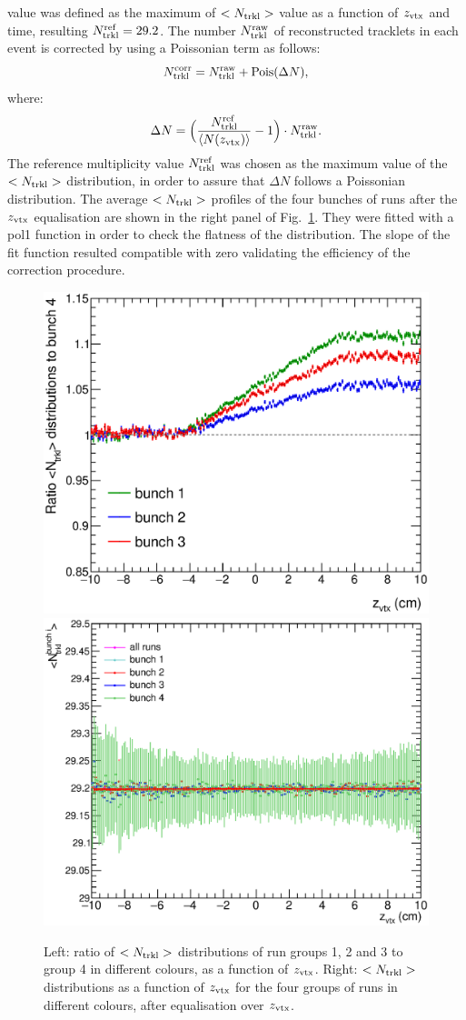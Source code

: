 value was defined as the maximum of $<N_{\rm trkl}>$ value as a function of $z_{\rm vtx}$ and time,
resulting $N_{\rm trkl}^{\rm ref} =  29.2$. 
The number $N_{\rm trkl}^{\rm raw}$ of reconstructed tracklets in each event
is corrected by using a Poissonian term as follows:
\begin{equation} 
\label{eq:NtrklCorr}
N_{\rm trkl}^{\rm corr} = N_{\rm trkl}^{\rm raw} + {\rm Pois}(\Delta N),
\end{equation}
where:
\begin{equation} 
\label{eq:NtrklCorr}
\Delta N = \Big (\frac{N_{\rm trkl}^{\rm ref}}{\langle N(z_{\rm vtx}) \rangle} -1 \Big ) \cdot N_{\rm trkl}^{\rm raw}.
\end{equation}
 The reference multiplicity value $N_{\rm trkl}^{\rm ref}$ was chosen as the
 maximum value of the \mbox{$<N_{\rm trkl}>$} distribution, in order to assure
 that $\Delta N$ follows a Poissonian distribution. 
The average $<N_{\rm trkl}>$ profiles of the four bunches of runs 
after the $z_{\rm vtx}$ equalisation are shown in the right panel of 
Fig.~\ref{fig:FourBunches}. They were fitted with a pol1 function in order
to check the flatness of the distribution. The slope of the fit function resulted compatible with zero
validating the efficiency of the correction procedure.

\begin{figure}[h]
\centering
 \includegraphics[width=.49\textwidth]{FigCap6/UncorrNtrklProfileDataRatio.eps}
 \includegraphics[width=.49\textwidth]{FigCap6/NtrkProfilesDataAfterZVxtEqual.eps}
 \caption{Left: ratio of $<N_{\rm trkl}>$ distributions of run groups 1, 2 and 3 to group 4 in different colours, as a function of $z_{\rm vtx}$. Right: $<N_{\rm trkl}>$ distributions as a function of $z_{\rm vtx}$ for the four groups of runs in different colours, after equalisation over $z_{\rm vtx}$.}
 \label{fig:FourBunches}
\end{figure}

